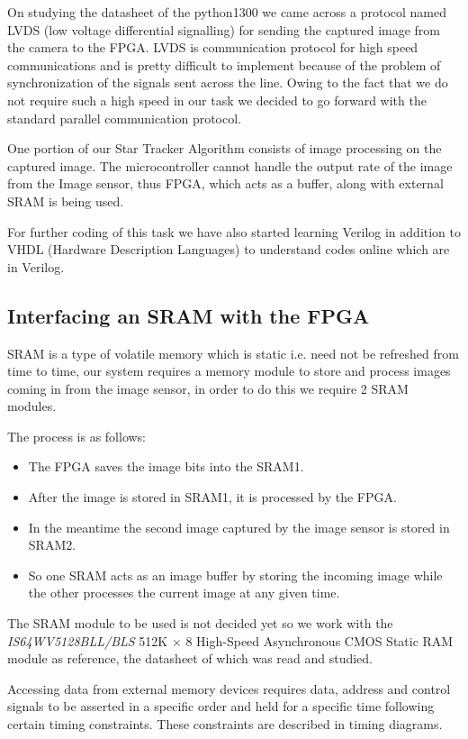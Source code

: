 \documentclass[../../main.tex]{subfiles}
\begin{document}
On studying the datasheet of the python1300 we came across a protocol named LVDS (low voltage differential signalling) for sending the captured image from the camera to the FPGA. LVDS is communication protocol for high speed communications and is pretty difficult to implement because of the problem of synchronization of the signals sent across the line. Owing to the fact that we do not require such a high speed in our task we decided to go forward with the standard parallel communication protocol.

One portion of our Star Tracker Algorithm consists of image processing on the captured image.  The microcontroller cannot handle the output rate of the image from the Image sensor, thus FPGA, which acts as a buffer, along with external SRAM is being used. %

For further coding of this task we have also started learning Verilog in addition to VHDL (Hardware Description Languages) to understand codes online which are in Verilog.

\subsection{Interfacing an SRAM with the FPGA}
SRAM is a type of volatile memory which is static i.e. need not be refreshed from time to time, our system requires a memory module to store and process images coming in from the image sensor, in order to do this we require 2 SRAM modules.

The process is as follows:
\begin{itemize}
    \item The FPGA saves the image bits into the SRAM1.
    \item After the image is stored in SRAM1, it is processed by the FPGA.
    \item In the meantime the second image captured by the image sensor is stored in SRAM2.
    \item So one SRAM acts as an image buffer by storing the incoming image while the other processes the current image at any given time.
\end{itemize}

The SRAM module to be used is not decided yet so we work with the \textit{IS64WV5128BLL/BLS} 512K \(\times\) 8 High-Speed Asynchronous CMOS Static RAM module as reference, the datasheet of which was read and studied.

Accessing data from external memory devices requires data, address and control signals to be asserted in a specific order and held for a specific time following certain timing constraints. These constraints are described in timing diagrams.
\end{document}
